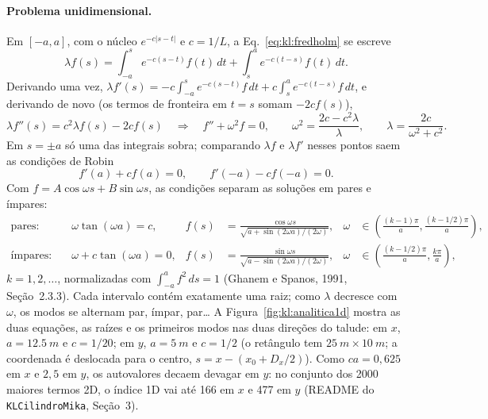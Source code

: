 \paragraph{Problema unidimensional.}
Em $[-a, a]$, com o núcleo $e^{-c|s - t|}$ e $c = 1/L$, a Eq.~\eqref{eq:kl:fredholm} se escreve
\begin{equation}
  \lambda f(s) = \int_{-a}^{s} e^{-c(s - t)} f(t) \, dt + \int_{s}^{a} e^{-c(t - s)} f(t) \, dt .
\end{equation}
Derivando uma vez,
$\lambda f'(s) = -c \int_{-a}^{s} e^{-c(s - t)} f \, dt + c \int_{s}^{a} e^{-c(t - s)} f \, dt$, e derivando de novo
(os termos de fronteira em $t = s$ somam $-2c f(s)$),
\begin{equation}
  \lambda f''(s) = c^2 \lambda f(s) - 2 c f(s)
  \quad\Longrightarrow\quad
  f'' + \omega^2 f = 0, \qquad \omega^2 = \frac{2c - c^2 \lambda}{\lambda}, \qquad
  \lambda = \frac{2c}{\omega^2 + c^2}.
  \label{eq:kl:edo}
\end{equation}
Em $s = \pm a$ só uma das integrais sobra; comparando $\lambda f$ e $\lambda f'$ nesses pontos saem as condições de Robin
\begin{equation}
  f'(a) + c f(a) = 0, \qquad f'(-a) - c f(-a) = 0 .
\end{equation}
Com $f = A \cos \omega s + B \sin \omega s$, as condições separam as soluções em pares e ímpares:
\begin{align}
  \text{pares:} \quad & \omega \tan(\omega a) = c, &
    f(s) &= \frac{\cos \omega s}{\sqrt{a + \sin(2 \omega a)/(2\omega)}}, &
    \omega &\in \left(\tfrac{(k-1)\pi}{a}, \tfrac{(k - 1/2)\pi}{a}\right), \label{eq:kl:par}\\
  \text{ímpares:} \quad & \omega + c \tan(\omega a) = 0, &
    f(s) &= \frac{\sin \omega s}{\sqrt{a - \sin(2 \omega a)/(2\omega)}}, &
    \omega &\in \left(\tfrac{(k-1/2)\pi}{a}, \tfrac{k\pi}{a}\right), \label{eq:kl:impar}
\end{align}
$k = 1, 2, \ldots$, normalizadas com $\int_{-a}^{a} f^2 \, ds = 1$ (Ghanem e Spanos, 1991, Seção~2.3.3). Cada
intervalo contém exatamente uma raiz; como $\lambda$ decresce com $\omega$, os modos se alternam par, ímpar, par\ldots
A Figura~\ref{fig:kl:analitica1d} mostra as duas equações, as raízes e os primeiros modos nas duas direções do talude:
em $x$, $a = \SI{12.5}{m}$ e $c = 1/20$; em $y$, $a = \SI{5}{m}$ e $c = 1/2$ (o retângulo tem $\SI{25}{m} \times
\SI{10}{m}$; a coordenada é deslocada para o centro, $s = x - (x_0 + D_x/2)$). Como $c a = 0{,}625$ em $x$ e $2{,}5$
em $y$, os autovalores decaem devagar em $y$: no conjunto dos 2000 maiores termos 2D, o índice 1D vai até 166 em $x$ e
477 em $y$ (README do \texttt{KLCilindroMika}, Seção~3).

